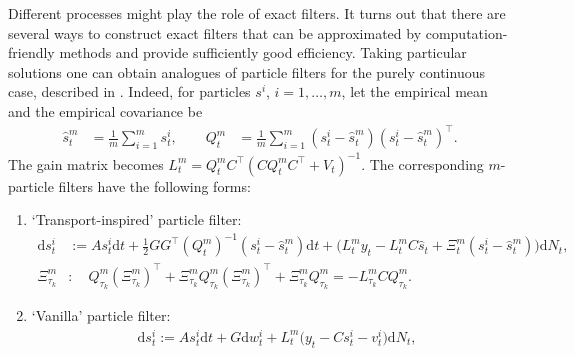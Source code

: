 \documentclass[12pt]{llncs}
\begin{document}
Different processes might play the role of exact filters. It turns out that there are several ways to construct exact filters that can be approximated by computation-friendly methods and provide sufficiently good efficiency.
Taking particular solutions %
one can obtain analogues of particle filters for the purely continuous case, described in \cite{bishop}. Indeed, for particles $s^i$, $i=1,\ldots,m$, let the empirical mean and the empirical covariance be
 \begin{align}
  \widehat s^{m}_t &= \frac{1}{m}\sum\limits_{i=1}^{m} s^i_t,
 \qquad
   Q^{m}_t &= \frac{1}{m}\sum\limits_{i=1}^{m} (s^i_t - \widehat s^{m}_t)(s^i_t - \widehat s^{m}_t)^\top.
 \end{align}
The gain matrix becomes $L_t^{m} = Q_t^{m} C^\top (C Q_t^{m} C^\top + V_t)^{-1}.$
The corresponding $m$-particle filters have the following forms:
\begin{enumerate}

\item `Transport-inspired' particle filter:
\begin{align}
    \mathrm{d} s^i_t &:= A s^i_t \mathrm{d} t +  \frac{1}{2}GG^\top (Q^{m}_t)^{-1} (s^i_t-\widehat s^{m}_t) \mathrm{d} t
    +  \Big(L^{m}_t y_t - L^{m}_t C \widehat s_t +\Xi^{m}_t (s^i_t - \widehat s^{m}_t) \Big) \mathrm{d} N_t,
    \label{eq:ch5: particles transport-insp}
    \\
    \Xi^{m}_{\tau_k} &: \quad Q^{m}_{\tau_k} (\Xi^{m}_{\tau_k})^\top + \Xi^{m}_{\tau_k} Q^{m}_{\tau_k} (\Xi^{m}_{\tau_k})^\top + \Xi^{m}_{\tau_k} Q^{m}_{\tau_k} = - L_{\tau_k}^{m} C Q^{m}_{\tau_k}.
    \label{eq:ch5: particles xi transport-insp}
\end{align}
\item `Vanilla' particle filter:
\begin{align}
\label{eq:ch5: particles vanilla}
&\mathrm{d} s^i_t := A s^i_t \mathrm{d} t +  G  \mathrm{d} w^i_t
    + L^{m}_t \Big(y_t - C s^i_t  - v^i_t \Big) \mathrm{d} N_t, %
\end{align}
\end{enumerate}
\end{document}
